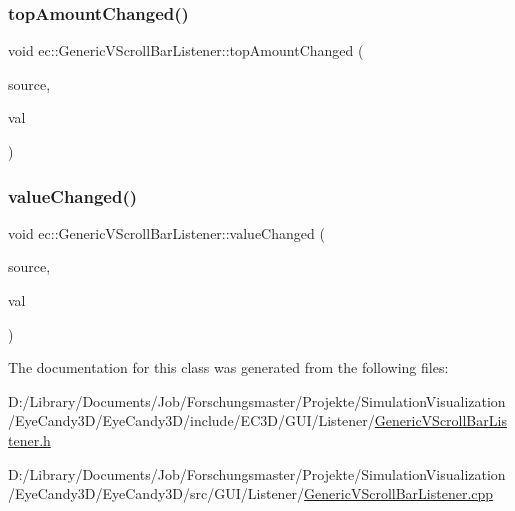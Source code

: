 \mbox{\label{classec_1_1_generic_v_scroll_bar_listener_aa781034d565c6b2f50ffea047fd0dc5f}} 
\subsubsection{\texorpdfstring{top\+Amount\+Changed()}{topAmountChanged()}}
{\footnotesize\ttfamily void ec\+::\+Generic\+V\+Scroll\+Bar\+Listener\+::top\+Amount\+Changed (\begin{DoxyParamCaption}\item[{agui\+::\+V\+Scroll\+Bar $\ast$}]{source,  }\item[{int}]{val }\end{DoxyParamCaption})\hspace{0.3cm}{\ttfamily [override]}}

\mbox{\label{classec_1_1_generic_v_scroll_bar_listener_a6718d45dd6536a326181775dc2c16570}} 
\subsubsection{\texorpdfstring{value\+Changed()}{valueChanged()}}
{\footnotesize\ttfamily void ec\+::\+Generic\+V\+Scroll\+Bar\+Listener\+::value\+Changed (\begin{DoxyParamCaption}\item[{agui\+::\+V\+Scroll\+Bar $\ast$}]{source,  }\item[{int}]{val }\end{DoxyParamCaption})\hspace{0.3cm}{\ttfamily [override]}}



The documentation for this class was generated from the following files\+:\begin{DoxyCompactItemize}
\item 
D\+:/\+Library/\+Documents/\+Job/\+Forschungsmaster/\+Projekte/\+Simulation\+Visualization/\+Eye\+Candy3\+D/\+Eye\+Candy3\+D/include/\+E\+C3\+D/\+G\+U\+I/\+Listener/\mbox{\hyperlink{_generic_v_scroll_bar_listener_8h}{Generic\+V\+Scroll\+Bar\+Listener.\+h}}\item 
D\+:/\+Library/\+Documents/\+Job/\+Forschungsmaster/\+Projekte/\+Simulation\+Visualization/\+Eye\+Candy3\+D/\+Eye\+Candy3\+D/src/\+G\+U\+I/\+Listener/\mbox{\hyperlink{_generic_v_scroll_bar_listener_8cpp}{Generic\+V\+Scroll\+Bar\+Listener.\+cpp}}\end{DoxyCompactItemize}
